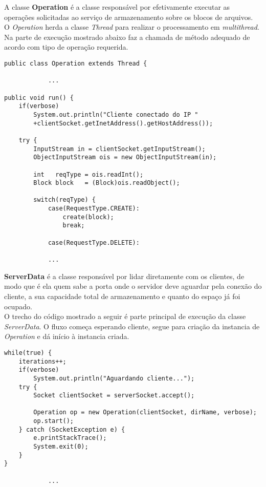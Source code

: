 A classe \textbf{Operation} é a classe responsável por efetivamente executar as operações solicitadas ao serviço de armazenamento sobre os blocos de arquivos.
\\

O \textit{Operation} herda a classe \textit{Thread} para realizar o processamento em \textit{multithread}.
Na parte de execução mostrado abaixo faz a chamada de método adequado de acordo com tipo de operação requerida.
\begin{lstlisting}[basicstyle=\ttfamily\footnotesize, frame=single]		
public class Operation extends Thread {
	
			...
			
public void run() {
	if(verbose)
		System.out.println("Cliente conectado do IP "
		+clientSocket.getInetAddress().getHostAddress());
	
	try {
		InputStream in = clientSocket.getInputStream();
		ObjectInputStream ois = new ObjectInputStream(in);
		
		int   reqType = ois.readInt();
		Block block   = (Block)ois.readObject();
		
		switch(reqType) {
			case(RequestType.CREATE):
				create(block);
				break;
		
			case(RequestType.DELETE):
			
			...
\end{lstlisting}



\textbf{ServerData} é a classe responsável por lidar diretamente com os clientes, de modo que é ela quem sabe a porta onde o servidor deve aguardar pela conexão do cliente, a sua capacidade total de armazenamento e quanto do espaço já foi ocupado.
\\

O trecho do código mostrado a seguir é parte principal de execução da classe \textit{ServerData}.
O fluxo começa esperando cliente,  segue para criação da instancia de \textit{Operation} e dá início à instancia criada.
\begin{lstlisting}[basicstyle=\ttfamily\footnotesize, frame=single]		
while(true) {
	iterations++;
	if(verbose)
		System.out.println("Aguardando cliente...");
	try {
		Socket clientSocket = serverSocket.accept();
		
		Operation op = new Operation(clientSocket, dirName, verbose);
		op.start();
	} catch (SocketException e) {
		e.printStackTrace();
		System.exit(0);
	}
}

			...
\end{lstlisting}

